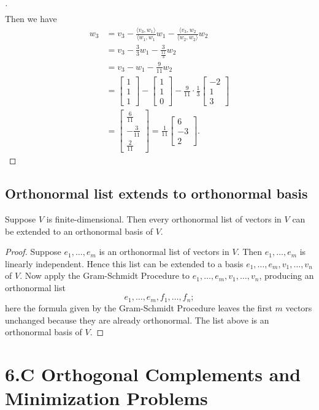 \documentclass[11pt]{article}
\begin{document}
\begin{enumerate}
\begin{proof}[\unskip\nopunct]
\begin{align*}
            \end{align*}
            Then we have 
            \begin{align*}
                w_3 &= v_3 - \frac{\langle v_3, w_1 \rangle}{\langle w_1, w_1} w_1 - \frac{\langle v_3, w_2}{\langle w_2, w_2 \rangle} w_2 \\
                &= v_3 - \frac{3}{3} w_1 - \frac{3}{\frac{11}{3}} w_2 \\
                &= v_3 - w_1 - \frac{9}{11} w_2 \\
                &= \begin{bmatrix}
                    1 \\ 1 \\ 1
                \end{bmatrix} - \begin{bmatrix}
                    1 \\ 1 \\ 0
                \end{bmatrix} - \frac{9}{11} \cdot \frac{1}{3} \begin{bmatrix}
                    -2 \\ 1 \\ 3
                \end{bmatrix} \\
                &= \begin{bmatrix}
                    \frac{6}{11} \\ - \frac{3}{11} \\ \frac{2}{11}
                \end{bmatrix} = \frac{1}{11} \begin{bmatrix}
                    6 \\ -3 \\ 2
                \end{bmatrix}.
            \end{align*}
        \end{proof}
    \end{enumerate}

    \subsection{Orthonormal list extends to orthonormal basis}

    Suppose $V$ is finite-dimensional. Then every orthonormal list of vectors in $V$ can be extended to an orthonormal basis of $V$.

    \begin{proof}
        Suppose \(e_1, \dots, e_m\) is an orthonormal list of vectors in $V$. Then \(e_1, \dots, e_m\) is linearly independent. Hence this list can be extended to a basis \(e_1, \dots, e_m, v_1, \dots, v_n\) of $V$. Now apply the Gram-Schmidt Procedure to \(e_1, \dots, e_m, v_1, \dots, v_n\), producing an orthonormal list \[e_1, \dots, e_m, f_1, \dots, f_n;\] here the formula given by the Gram-Schmidt Procedure leaves the first $m$ vectors unchanged because they are already orthonormal. The list above is an orthonormal basis of $V$. 
    \end{proof}
    \section{6.C Orthogonal Complements and Minimization Problems}

    
 
\end{document}
